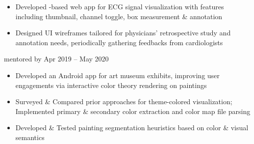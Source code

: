{\begin{itemize}
        \item Developed -based web app for ECG signal visualization
        with features including thumbnail, channel toggle, box measurement \& annotation%
        \item Designed UI wireframes tailored for physicians' retrospective study and annotation needs, periodically gathering feedbacks from cardiologists%
    \end{itemize}%
    \dividerSmall

        {{\bodyfontsize \color{body} mentored by} }%
        {Apr 2019 -- May 2020}
        {}{}%
    \begin{itemize}%
        \item Developed an  Android app
        for art museum exhibits, improving user engagements via interactive color theory rendering on paintings%
        \item Surveyed \& Compared prior approaches for theme-colored visualization; Implemented primary \& secondary color extraction and color map file parsing%
        \item Developed \& Tested painting segmentation heuristics based on color \& visual semantics%
    \end{itemize}%
    \dividerSmall
}%
%